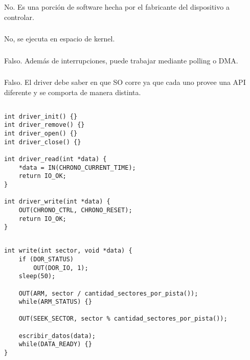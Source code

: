 \subsubsection{}
No. Es una porción de software hecha por el fabricante del dispositivo a
controlar.

\subsubsection{}
No, se ejecuta en espacio de kernel.

\subsubsection{}
Falso. Además de interrupciones, puede trabajar mediante polling o DMA.

\subsubsection{}
Falso. El driver debe saber en que SO corre ya que cada uno provee una API
diferente y se comporta de manera distinta.

\subsection{}
\begin{codesnippet}
\begin{verbatim}
int driver_init() {}
int driver_remove() {}
int driver_open() {}
int driver_close() {}

int driver_read(int *data) {
    *data = IN(CHRONO_CURRENT_TIME);
    return IO_OK;
}

int driver_write(int *data) {
    OUT(CHRONO_CTRL, CHRONO_RESET);
    return IO_OK;
}
\end{verbatim}
\end{codesnippet}

\subsection{}

\setcounter{subsection}{10}
\subsection{}

\subsubsection{}
\begin{codesnippet}
\begin{verbatim}
int write(int sector, void *data) {
    if (DOR_STATUS)
        OUT(DOR_IO, 1);
    sleep(50);

    OUT(ARM, sector / cantidad_sectores_por_pista());
    while(ARM_STATUS) {}

    OUT(SEEK_SECTOR, sector % cantidad_sectores_por_pista());

    escribir_datos(data);
    while(DATA_READY) {}
}
\end{verbatim}
\end{codesnippet}

